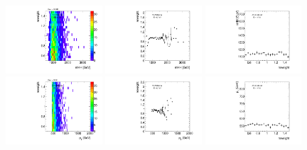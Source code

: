 \begin{figure}[htbp!]
\begin{center}
\includegraphics[width=0.32\textwidth,angle=-90]{figures/boosted/AppendixReweight/Weights/4Trk_Sideband_mHH_l_weight.pdf}
\includegraphics[width=0.32\textwidth,angle=-90]{figures/boosted/AppendixReweight/Weights/4Trk_Sideband_mHH_l_weight_profx.pdf}
\includegraphics[width=0.32\textwidth,angle=-90]{figures/boosted/AppendixReweight/Weights/4Trk_Sideband_mHH_l_weight_profy.pdf}\\
\includegraphics[width=0.32\textwidth,angle=-90]{figures/boosted/AppendixReweight/Weights/4Trk_Sideband_leadHCand_Pt_m_weight.pdf}
\includegraphics[width=0.32\textwidth,angle=-90]{figures/boosted/AppendixReweight/Weights/4Trk_Sideband_leadHCand_Pt_m_weight_profx.pdf}
\includegraphics[width=0.32\textwidth,angle=-90]{figures/boosted/AppendixReweight/Weights/4Trk_Sideband_leadHCand_Pt_m_weight_profy.pdf}\\

\end{center}
\end{figure}
